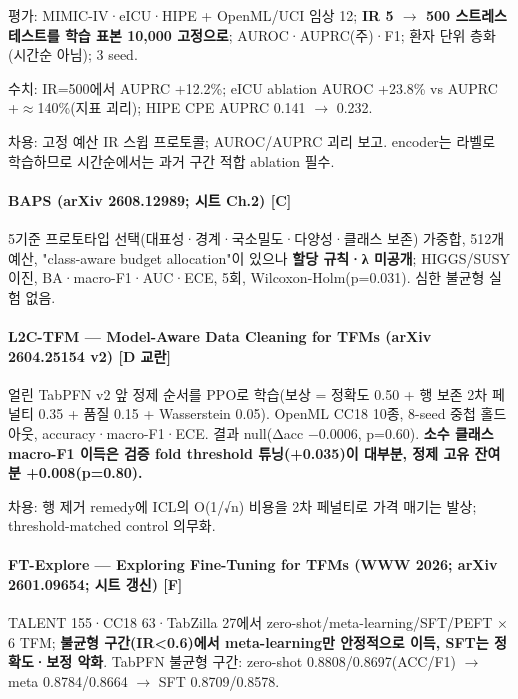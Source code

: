 \par\noindent \textbullet\enspace 평가: MIMIC-IV·eICU·HIPE +\allowbreak{} OpenML/\allowbreak{}UCI 임상 12; \textbf{IR 5 \ensuremath{\rightarrow} 500 스트레스 테스트를 학습 표본 10,000 고정으로}; AUROC·AUPRC(주)·F1; 환자 단위 층화(시간순 아님); 3 seed.


\par\noindent \textbullet\enspace 수치: IR=\allowbreak{}500에서 AUPRC +\allowbreak{}12.2\%; eICU ablation AUROC +\allowbreak{}23.8\% vs AUPRC +\allowbreak{}\ensuremath{\approx}140\%(지표 괴리); HIPE CPE AUPRC 0.141 \ensuremath{\rightarrow} 0.232.


\par\noindent \textbullet\enspace 차용: 고정 예산 IR 스윕 프로토콜; AUROC/\allowbreak{}AUPRC 괴리 보고. encoder는 라벨로 학습하므로 시간순에서는 과거 구간 적합 ablation 필수.


\paragraph{BAPS (arXiv 2608.12989; 시트 Ch.2) [C]}
\par\noindent \textbullet\enspace 5기준 프로토타입 선택(대표성·경계·국소밀도·다양성·클래스 보존) 가중합, 512개 예산, "class-aware budget allocation"이 있으나 \textbf{할당 규칙·λ 미공개}; HIGGS/\allowbreak{}SUSY 이진, BA·macro-F1·AUC·ECE, 5회, Wilcoxon-Holm(p=\allowbreak{}0.031). 심한 불균형 실험 없음.


\paragraph{L2C-TFM — Model-Aware Data Cleaning for TFMs (arXiv 2604.25154 v2) [D 교란]}
\par\noindent \textbullet\enspace 얼린 TabPFN v2 앞 정제 순서를 PPO로 학습(보상 =\allowbreak{} 정확도 0.50 +\allowbreak{} 행 보존 2차 페널티 0.35 +\allowbreak{} 품질 0.15 +\allowbreak{} Wasserstein 0.05). OpenML CC18 10종, 8-seed 중첩 홀드아웃, accuracy·macro-F1·ECE. 결과 null(Δacc −0.0006, p=\allowbreak{}0.60). \textbf{소수 클래스 macro-F1 이득은 검증 fold threshold 튜닝(+\allowbreak{}0.035)이 대부분, 정제 고유 잔여분 +\allowbreak{}0.008(p=\allowbreak{}0.80).}


\par\noindent \textbullet\enspace 차용: 행 제거 remedy에 ICL의 O(1/\allowbreak{}√n) 비용을 2차 페널티로 가격 매기는 발상; threshold-matched control 의무화.


\paragraph{FT-Explore — Exploring Fine-Tuning for TFMs (WWW 2026; arXiv 2601.09654; 시트 갱신) [F]}
\par\noindent \textbullet\enspace TALENT 155·CC18 63·TabZilla 27에서 zero-shot/\allowbreak{}meta-learning/\allowbreak{}SFT/\allowbreak{}PEFT × 6 TFM; \textbf{불균형 구간(IR<0.6)에서 meta-learning만 안정적으로 이득, SFT는 정확도·보정 악화}. TabPFN 불균형 구간: zero-shot 0.8808/\allowbreak{}0.8697(ACC/\allowbreak{}F1)  \ensuremath{\rightarrow}  meta 0.8784/\allowbreak{}0.8664  \ensuremath{\rightarrow}  SFT 0.8709/\allowbreak{}0.8578.



